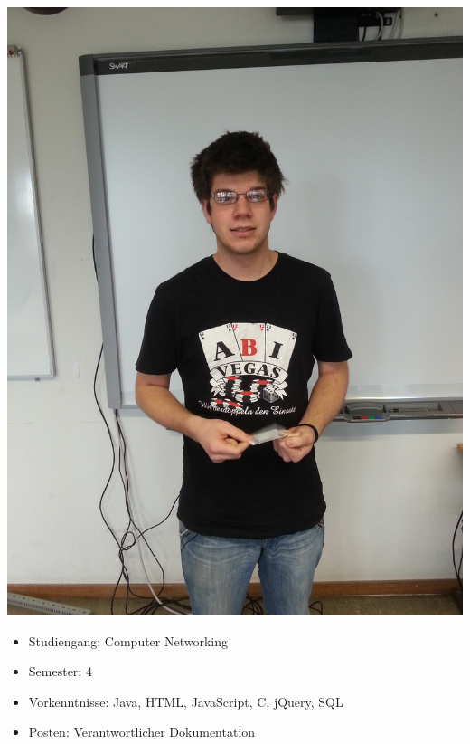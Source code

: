 \begin{minipage}{0.28\textwidth} 
\includegraphics[width=\textwidth]{content/pictures/Marcel.jpg}
\end{minipage}%
\begin{minipage}{0.7\textwidth}
\begin{itemize}
   \item Studiengang: Computer Networking
  \item Semester: 4
  \item Vorkenntnisse: Java, HTML, JavaScript, C, jQuery, SQL
  \item Posten: Verantwortlicher Dokumentation
\end{itemize}
\end{minipage}
